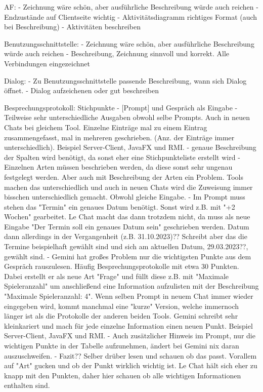             AF:
            - Zeichnung wäre schön, aber ausführliche Beschreibung würde auch reichen
            - Endzustände auf Clientseite wichtig
            - Aktivitätsdiagramm richtiges Format (auch bei Beschreibung)
            - Aktivitäten beschreiben
        
            Benutzungsschnittstelle:
            - Zeichnung wäre schön, aber ausführliche Beschreibung würde auch reichen
            - Beschreibung, Zeichnung sinnvoll und korrekt. Alle Verbindungen eingezeichnet
        
            Dialog:
            - Zu Benutzungsschnittstelle passende Beschreibung, wann sich Dialog öffnet.
            - Dialog aufzeichenen oder gut beschreiben
    
    
    Besprechungsprotokoll:
        Stichpunkte
        - [Prompt] und Gespräch als Eingabe
        - Teilweise sehr unterschiedliche Ausgaben obwohl selbe Prompts. Auch in neuen Chats bei gleichem Tool.
        Einzelne Einträge mal zu einem Eintrag zusammengefasst, mal in mehreren geschrieben. (Anz. der Einträge immer unterschiedlich).
        Beispiel Server-Client, JavaFX und RMI.
        - genaue Beschreibung der Spalten wird benötigt, da sonst eher eine Stichpunkteliste erstellt wird
        - Einzelnen Arten müssen beschrieben werden, da diese sonst sehr ungenau festgelegt werden. Aber auch mit
        Beschreibung der Arten ein Problem. Tools machen das unterschiedlich und auch in neuen Chats wird die Zuweisung immer 
        bisschen unterschiedlich gemacht. Obwohl gleiche Eingabe.
        - Im Prompt muss stehen das "Termin" ein genaues Datum benötigt. Sonst wird z.B. mit "+2 Wochen" gearbeitet. Le Chat 
        macht das dann trotzdem nicht, da muss als neue Eingabe "Der Termin soll ein genaues Datum sein" geschrieben werden.
        Datum dann allerdings in der Vergangenheit (z.B. 31.10.2023)?? Schreibt aber das die Termine beispielhaft gewählt sind
        und sich am aktuellen Datum, 29.03.2023??, gewählt sind.
        - Gemini hat großes Problem nur die wichtigsten Punkte aus dem Gespräch rauszulesen. Häufig Besprechungsprotokolle mit etwa 
        30 Punkten. Dabei erstellt er als neue Art "Frage" und füllt diese z.B. mit "Maximale Spieleranzahl" um anschließend eine 
        Information aufzulisten mit der Beschreibung "Maximale Spieleranzahl: 4". Wenn selben Prompt in neuem Chat immer wieder 
        eingegeben wird, kommt manchmal eine "kurze" Version, welche immernoch länger ist als die Protokolle der anderen beiden Tools.
        Gemini schreibt sehr kleinkariert und mach für jede einzelne Information einen neuen Punkt. Beispiel Server-Client, JavaFX und RMI.
        - Auch zusätzlicher Hinweis im Prompt, nur die wichtigen Punkte in der Tabelle aufzunehmen, ändert bei Gemini nix daran auszuschweifen.
        - Fazit?? Selber drüber lesen und schauen ob das passt. Vorallem auf "Art" gucken und ob der Punkt wirklich wichtig ist. Le Chat
        hält sich eher zu knapp mit den Punkten, daher hier schauen ob alle wichtigen Informationen enthalten sind.

